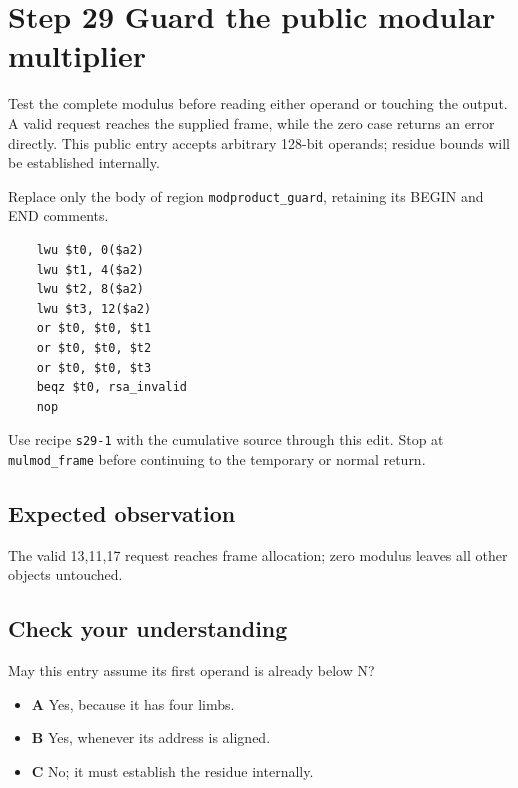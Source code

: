\section{Step 29 Guard the public modular multiplier}\label{rsa-s29}

Test the complete modulus before reading either operand or touching the output. A valid request reaches the supplied frame, while the zero case returns an error directly. This public entry accepts arbitrary 128-bit operands; residue bounds will be established internally.

Replace only the body of region \texttt{modproduct\_guard}, retaining its BEGIN and END comments.

\begin{verbatim}
    lwu $t0, 0($a2)
    lwu $t1, 4($a2)
    lwu $t2, 8($a2)
    lwu $t3, 12($a2)
    or $t0, $t0, $t1
    or $t0, $t0, $t2
    or $t0, $t0, $t3
    beqz $t0, rsa_invalid
    nop
\end{verbatim}

Use recipe \texttt{s29-1} with the cumulative source through this edit. Stop at \texttt{mulmod\_frame} before continuing to the temporary or normal return.

\subsection{Expected observation}
The valid 13,11,17 request reaches frame allocation; zero modulus leaves all other objects untouched.

\subsection{Check your understanding}
May this entry assume its first operand is already below N?

\begin{itemize}
  \item \textbf{A} Yes, because it has four limbs.
  \item \textbf{B} Yes, whenever its address is aligned.
  \item \textbf{C} No; it must establish the residue internally.
\end{itemize}

